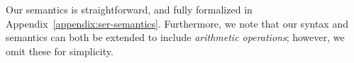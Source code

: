 %    
%
%
%
%
%



Our semantics is straightforward, and fully formalized in Appendix~\ref{appendix:ser-semantics}.
%
Furthermore, we note that our syntax and semantics can both be extended to include \textit{arithmetic operations}; however, we omit these for simplicity. 
    
    

